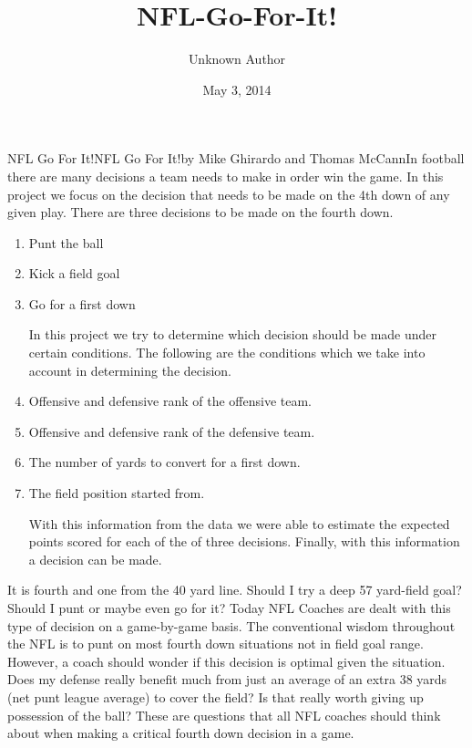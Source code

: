 \documentclass[letterpaper,10pt,english]{/anaconda/lib/python2.7/site-packages/sphinx/texinputs/sphinxhowto}
\title{NFL-Go-For-It!}
\date{May 3, 2014}
\author{Unknown Author}
\begin{document}
        
            \maketitle
        

        


        
        NFL Go For It!NFL Go For It!by Mike Ghirardo and Thomas McCannIn football there are many decisions a team needs to make in order win
the game. In this project we focus on the decision that needs to be made
on the 4th down of any given play. There are three decisions to be made
on the fourth down.

\begin{enumerate}
\def\labelenumi{\arabic{enumi}.}
\itemsep1pt\parskip0pt
\item
  Punt the ball
\item
  Kick a field goal
\item
  Go for a first down

  In this project we try to determine which decision should be made
  under certain conditions. The following are the conditions which we
  take into account in determining the decision.
\item
  Offensive and defensive rank of the offensive team.
\item
  Offensive and defensive rank of the defensive team.
\item
  The number of yards to convert for a first down.
\item
  The field position started from.

  With this information from the data we were able to estimate the
  expected points scored for each of the of three decisions. Finally,
  with this information a decision can be made.
\end{enumerate}It is fourth and one from the 40 yard line. Should I try a deep 57
yard-field goal? Should I punt or maybe even go for it? Today NFL
Coaches are dealt with this type of decision on a game-by-game basis.
The conventional wisdom throughout the NFL is to punt on most fourth
down situations not in field goal range. However, a coach should wonder
if this decision is optimal given the situation. Does my defense really
benefit much from just an average of an extra 38 yards (net punt league
average) to cover the field? Is that really worth giving up possession
of the ball? These are questions that all NFL coaches should think about
when making a critical fourth down decision in a game.
\end{document}
